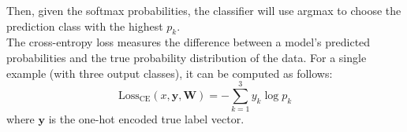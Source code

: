 Then, given the softmax probabilities, the classifier will use argmax to choose the prediction class with the highest $p_k$. \\

The cross-entropy loss measures the difference between a model's predicted probabilities and the true probability distribution of the data. For a single example (with three output classes), it can be computed as follows: $$\text{Loss}_{\text{CE}}(x, \mathbf{y}, \mathbf{W}) = -\sum_{k=1}^{3} y_k \log p_k$$
where $\mathbf{y}$ is the one-hot encoded true label vector.

\begin{enumerate}

  

  

  

  

\end{enumerate}
